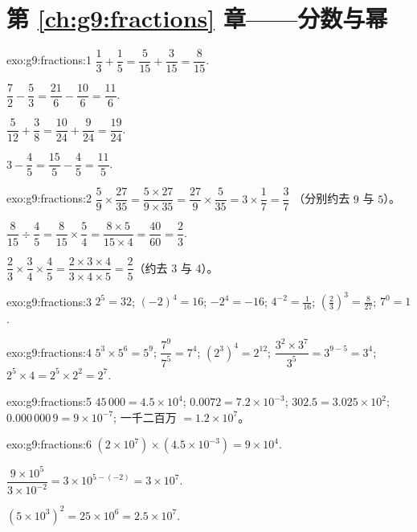 \section*{第 \ref{ch:g9:fractions} 章——分数与幂}

\begin{solution}{exo:g9:fractions:1}
$\dfrac13 + \dfrac15 = \dfrac{5}{15} + \dfrac{3}{15} = \dfrac{8}{15}$.

$\dfrac72 - \dfrac53 = \dfrac{21}{6} - \dfrac{10}{6} = \dfrac{11}{6}$.

$\dfrac{5}{12} + \dfrac38 = \dfrac{10}{24} + \dfrac{9}{24} =
\dfrac{19}{24}$.

$3 - \dfrac45 = \dfrac{15}{5} - \dfrac45 = \dfrac{11}{5}$.
\end{solution}

\begin{solution}{exo:g9:fractions:2}
$\dfrac59 \times \dfrac{27}{35} = \dfrac{5 \times 27}{9 \times 35}
= \dfrac{27}{9} \times \dfrac{5}{35} = 3 \times \dfrac17 = \dfrac37$
（分别约去 $9$ 与 $5$）。

$\dfrac{8}{15} \div \dfrac45 = \dfrac{8}{15} \times \dfrac54
= \dfrac{8 \times 5}{15 \times 4} = \dfrac{40}{60} = \dfrac23$.

$\dfrac23 \times \dfrac34 \times \dfrac45 = \dfrac{2 \times 3 \times 4}
{3 \times 4 \times 5} = \dfrac25$（约去 $3$ 与 $4$）。
\end{solution}

\begin{solution}{exo:g9:fractions:3}
$2^5 = 32$; \quad $(-2)^4 = 16$; \quad $-2^4 = -16$; \quad
$4^{-2} = \frac{1}{16}$; \quad
$\left(\frac23\right)^3 = \frac{8}{27}$; \quad $7^0 = 1$.
\end{solution}

\begin{solution}{exo:g9:fractions:4}
$5^3 \times 5^6 = 5^9$; \quad $\dfrac{7^9}{7^5} = 7^4$; \quad
$\left(2^3\right)^4 = 2^{12}$; \quad
$\dfrac{3^2 \times 3^7}{3^5} = 3^{9-5} = 3^4$; \quad
$2^5 \times 4 = 2^5 \times 2^2 = 2^7$.
\end{solution}

\begin{solution}{exo:g9:fractions:5}
$45\,000 = 4.5 \times 10^4$; \quad
$0.0072 = 7.2 \times 10^{-3}$; \quad
$302.5 = 3.025 \times 10^2$; \quad
$0.000\,000\,9 = 9 \times 10^{-7}$; \quad
一千二百万 $= 1.2 \times 10^7$。
\end{solution}

\begin{solution}{exo:g9:fractions:6}
$(2 \times 10^7) \times (4.5 \times 10^{-3}) = 9 \times 10^{4}$.

$\dfrac{9 \times 10^5}{3 \times 10^{-2}} = 3 \times 10^{5 - (-2)}
= 3 \times 10^7$.

$(5 \times 10^3)^2 = 25 \times 10^6 = 2.5 \times 10^7$.
\end{solution}

